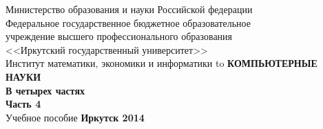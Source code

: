 \documentclass[a4paper,14pt, openany, twoside, draft]{extbook} %
\newcommand{\aaa}[2][acolor]{\noindent\textcolor{eclr}%
{+\ [}\textcolor{#1}{#2}\textcolor{eclr}{]}}
\begin{document}

\renewcommand{\chaptername}{} %
\renewcommand{\refname}{Рекомендуемая литература} %
\renewcommand{\bibname}{\refname}
\begin{titlepage}
\thispagestyle{empty}
\begin{center}{\small{}
Министерство образования и науки
Российской федерации \\
Федеральное государственное бюджетное образовательное\\
учреждение высшего профессионального образования\\
<<Иркутский государственный университет>> \\
Институт математики, экономики и информатики
}
\vfill
\hbox to \linewidth{\hfill\bfseries Е.~А.~Черкашин\hfill}
 \vspace{2em}
{\large\bfseries КОМПЬЮТЕРНЫЕ НАУКИ\\В четырех частях\\Часть 4\\}
 \vspace{2em}
{Учебное пособие}
\vfill
\vfill
 \textbf{Иркутск 2014}
\end{center}
\end{titlepage}
\end{document}
